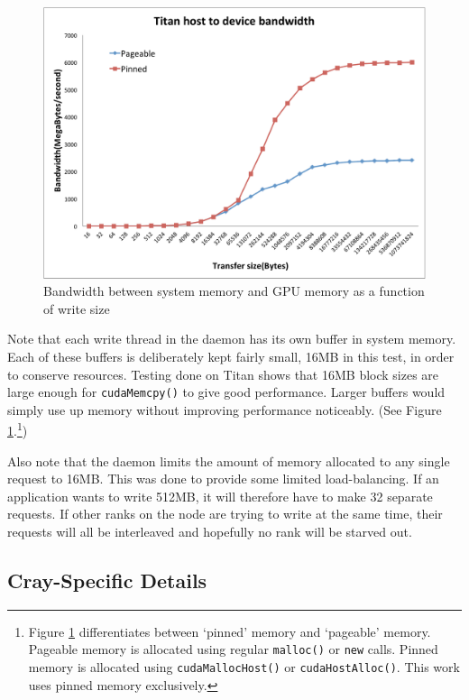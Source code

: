 \begin{figure}
\includegraphics[width=\linewidth]{figures/Host2Device_BW.pdf}
\caption{Bandwidth between system memory and GPU memory as a function of write size\cite{ac_guide}} 
\label{fig:transfer_bw}
\end{figure}

Note that each write thread in the daemon has its own buffer in system memory.  Each of these buffers is deliberately kept fairly small, 16MB in this test, in order to conserve resources.  Testing done on Titan shows that 16MB block sizes are large enough for \texttt{cudaMemcpy()} to give good performance.\cite{ac_guide} Larger buffers would simply use up memory without improving performance noticeably. (See Figure \ref{fig:transfer_bw}.\footnote{Figure \ref{fig:transfer_bw} differentiates between `pinned' memory and `pageable' memory.  Pageable memory is allocated using regular \texttt{malloc()} or \texttt{new} calls.  Pinned memory is allocated using \texttt{cudaMallocHost()} or \texttt{cudaHostAlloc()}.\cite{cuda_pinned_memory}  This work uses pinned memory exclusively.})

Also note that the daemon limits the amount of memory allocated to any single request to 16MB.  This was done to provide some limited load-balancing.  If an application wants to write 512MB, it will therefore have to make 32 separate requests.  If other ranks on the node are trying to write at the same time, their requests will all be interleaved and hopefully no rank will be starved out.


\subsection{Cray-Specific Details}
\label{subsec:cray-specific}

